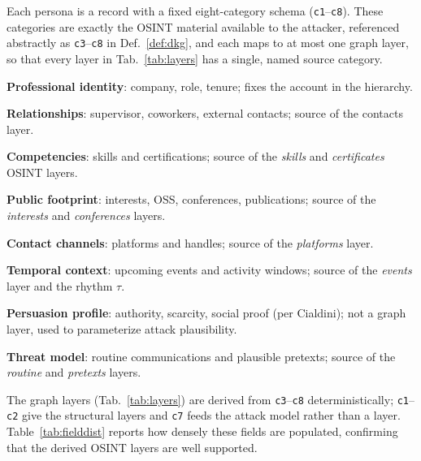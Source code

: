 Each persona is a record with a fixed eight-category schema (\texttt{c1}--\texttt{c8}). These categories are exactly the OSINT material available to the attacker, referenced abstractly as \texttt{c3}--\texttt{c8} in Def.~\ref{def:dkg}, and each maps to at most one graph
layer, so that every layer in Tab.~\ref{tab:layers} has a single, named source category.
\begin{description}[leftmargin=2.6em,style=nextline,noitemsep,topsep=2pt]
  \item[\texttt{c1}] \textbf{Professional identity}: company, role, tenure; fixes the account in the hierarchy.
  \item[\texttt{c2}] \textbf{Relationships}: supervisor, coworkers, external contacts; source of the contacts layer.
  \item[\texttt{c3}] \textbf{Competencies}: skills and certifications; source of the \emph{skills} and \emph{certificates} OSINT layers.
  \item[\texttt{c4}] \textbf{Public footprint}: interests, OSS, conferences, publications; source of the \emph{interests} and \emph{conferences} layers.
  \item[\texttt{c5}] \textbf{Contact channels}: platforms and handles; source of the \emph{platforms} layer.
  \item[\texttt{c6}] \textbf{Temporal context}: upcoming events and activity windows; source of the \emph{events} layer and the rhythm $\tau$.
  \item[\texttt{c7}] \textbf{Persuasion profile}: authority, scarcity, social proof (per Cialdini); not a graph layer, used to parameterize attack plausibility.
  \item[\texttt{c8}] \textbf{Threat model}: routine communications and plausible pretexts; source of the \emph{routine} and \emph{pretexts} layers.
\end{description}
\noindent The graph layers (Tab.~\ref{tab:layers}) are derived from \texttt{c3}--\texttt{c8} deterministically;
\texttt{c1}--\texttt{c2} give the structural layers and \texttt{c7} feeds the attack model rather than a layer.
Table~\ref{tab:fielddist} reports how densely these fields are populated, confirming that the derived OSINT
layers are well supported.


